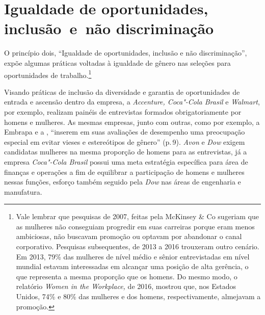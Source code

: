 \section{Igualdade de oportunidades, inclusão~e~não discriminação}

O princípio dois, ``Igualdade de oportunidades, inclusão e
não discriminação'', expõe algumas práticas voltadas à igualdade de
gênero nas seleções para oportunidades de trabalho.\footnote{Vale
  lembrar que pesquisas de 2007, feitas pela McKinsey \& Co sugeriam que
  as mulheres não conseguiam progredir em suas carreiras porque eram
  menos ambiciosas, não buscavam promoção ou optavam por abandonar o
  canal corporativo. Pesquisas subsequentes, de 2013 a 2016 trouxeram
  outro cenário. Em 2013, 79\% das mulheres de nível médio e sênior
  entrevistadas em nível mundial estavam interessadas em alcançar uma
  posição de alta gerência, o que representa a mesma proporção que os
  homens. Do mesmo modo, o relatório \emph{Women in the Workplace,} de
  2016, mostrou que, nos Estados Unidos, 74\% e 80\% das mulheres e dos
  homens, respectivamente, almejavam a promoção.}

Visando práticas de inclusão da diversidade e garantia de oportunidades
de entrada e ascensão dentro da empresa, a \emph{Accenture, Coca"-Cola
Brasil} e \emph{Walmart}, por exemplo, realizam painéis de entrevistas
formados obrigatoriamente por homens e mulheres. As mesmas empresas,
junto com outras, como por exemplo, a Embrapa e a , ``inserem em suas
avaliações de desempenho uma preocupação especial em evitar vieses e
estereótipos de gênero'' (p.\,9). \emph{Avon} e \emph{Dow} exigem
candidatas mulheres na mesma proporção de homens para as entrevistas, já
a empresa \emph{Coca"-Cola Brasil} possui uma meta estratégia específica
para área de finanças e operações a fim de equilibrar a participação de
homens e mulheres nessas funções, esforço também seguido pela \emph{Dow}
nas áreas de engenharia e manufatura.

